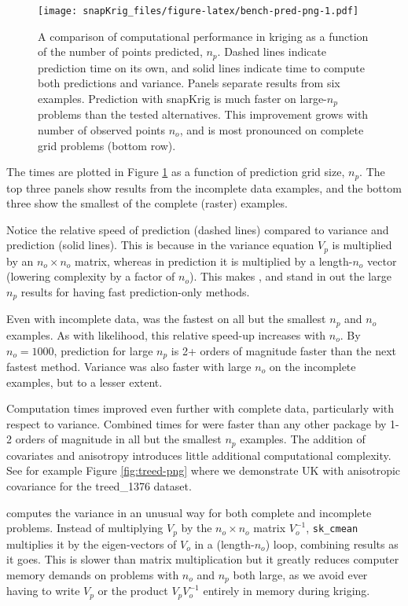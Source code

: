 \begin{figure}
\centering
\texttt{[image: snapKrig\_files/figure-latex/bench-pred-png-1.pdf]}
\caption{\label{fig:bench-pred-png}A comparison of computational performance in kriging as a function of the number of points predicted, \(n_p\). Dashed lines indicate prediction time on its own, and solid lines indicate time to compute both predictions and variance. Panels separate results from six examples. Prediction with snapKrig is much faster on large-\(n_p\) problems than the tested alternatives. This improvement grows with number of observed points \(n_o\), and is most pronounced on complete grid problems (bottom row).}
\end{figure}

The times are plotted in Figure \ref{fig:bench-pred-png} as a function of prediction grid size, \(n_p\). The top three panels show results from the incomplete data examples, and the bottom three show the smallest of the complete (raster) examples.

Notice the relative speed of prediction (dashed lines) compared to variance and prediction (solid lines). This is because in the variance equation \(V_p\) is multiplied by an \(n_o \times n_o\) matrix, whereas in prediction it is multiplied by a length-\(n_o\) vector (lowering complexity by a factor of \(n_o\)). This makes , and  stand in out the large \(n_p\) results for having fast prediction-only methods.

Even with incomplete data,  was the fastest on all but the smallest \(n_p\) and \(n_o\) examples. As with likelihood, this relative speed-up increases with \(n_o\). By \(n_o=1000\), prediction for large \(n_p\) is 2+ orders of magnitude faster than the next fastest method. Variance was also faster with large \(n_o\) on the incomplete examples, but to a lesser extent.

Computation times improved even further with complete data, particularly with respect to variance. Combined times for  were faster than any other package by 1-2 orders of magnitude in all but the smallest \(n_p\) examples. The addition of covariates and anisotropy introduces little additional computational complexity. See for example Figure \ref{fig:treed-png} where we demonstrate UK with anisotropic covariance for the treed\_1376 dataset.

 computes the variance in an unusual way for both complete and incomplete problems. Instead of multiplying \(V_p\) by the \(n_o \times n_o\) matrix \(V_o^{-1}\), \texttt{sk\_cmean} multiplies it by the eigen-vectors of \(V_o\) in a (length-\(n_o\)) loop, combining results as it goes. This is slower than matrix multiplication but it greatly reduces computer memory demands on problems with \(n_o\) and \(n_p\) both large, as we avoid ever having to write \(V_p\) or the product \(V_p V_o^{-1}\) entirely in memory during kriging.

